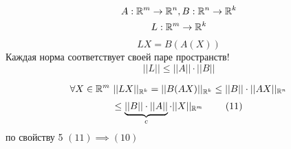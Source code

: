 \documentclass[main]{subfiles}
\begin{document}
    \begin{theorem}
    \begin{gather*}
        A : {\mathbb{R}}^m \rightarrow {\mathbb{R}}^n, B: {\mathbb{R}}^n \rightarrow {\mathbb{R}}^k \\
        L: {\mathbb{R}}^m \rightarrow {\mathbb{R}}^k \\
    \end{gather*}
        \[LX = B(A(X)) \]
        Каждая норма соответствует своей паре пространств! 
        \[||L|| \leq ||A|| \cdot ||B|| \tag{10}\]

    \end{theorem}
    \begin{longProof}
        \begin{gather*}
            \forall X \in {\mathbb{R}}^m \text{  }||LX||_{{\mathbb{R}}^k} = ||B(AX)||_{{\mathbb{R}}^k}
        \leq ||B|| \cdot ||AX||_{{\mathbb{R}}^n} 
        \end{gather*}
        \[\leq \underbrace{||B|| \cdot ||A||}_{c}
         \cdot ||X||_{{\mathbb{R}}^m}\   \tag{11} \]
        по свойству 5 $(11) \implies (10)$
    \end{longProof}
\end{document}
